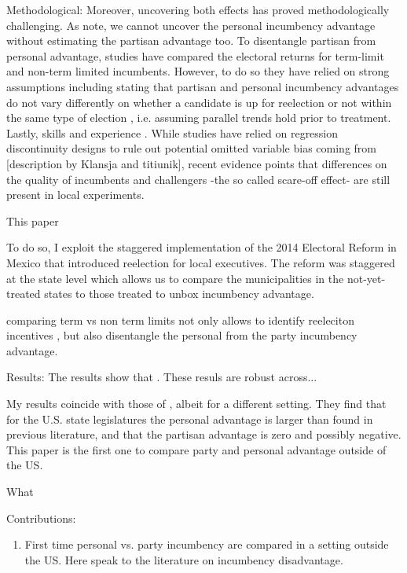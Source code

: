 \documentclass[12pt]{amsart}
\numberwithin{equation}{section}
\theoremstyle{definition}
\theoremstyle{definition}
\theoremstyle{definition}
\begin{document}
Methodological:
Moreover, uncovering both effects has proved methodologically challenging. As \citet{fowler_hall_2014} note, we cannot uncover the personal incumbency advantage without estimating the partisan advantage too. 
To disentangle partisan from personal advantage, studies have compared the electoral returns for term-limit and non-term limited incumbents. However, to do so they have relied on strong assumptions including stating that partisan and personal incumbency advantages do not vary differently on whether a candidate is up for reelection or not within the same type of election \citep{fowler_hall_2014, ansolabehere_snyder_2004}, i.e. assuming parallel trends hold prior to treatment. Lastly, skills and experience \citep{ferraz_finan_2008, ferraz_finan_2011}. While studies have relied on regression discontinuity designs to rule out potential omitted variable bias coming from [description by Klansja and titiunik], recent evidence points that differences on the quality of incumbents and challengers -the so called scare-off effect- are still present in local experiments. 

This paper

To do so, I exploit the staggered implementation of the 2014 Electoral Reform in Mexico that introduced reelection for local executives. The reform was staggered at the state level which allows us to compare the municipalities in the not-yet-treated states to those treated to unbox incumbency advantage.  

comparing term vs non term limits not only allows to identify reeleciton incentives \citep{ashworth_2012}, but also disentangle the personal from the party incumbency advantage. 

Results: 
The results show that .
These resuls are robust across...

My results coincide with those of \citep{fowler_hall_2014}, albeit for a different setting. They find that for the U.S. state legislatures the personal advantage is larger than found in previous literature, and that the partisan advantage is zero and possibly negative. This paper is the first one to compare party and personal advantage outside of the US. 

What 

Contributions:
\begin{enumerate}
	\item First time personal vs. party incumbency are compared in a setting outside the US. Here speak to the literature on incumbency disadvantage. 
\end{enumerate}
\end{document}
